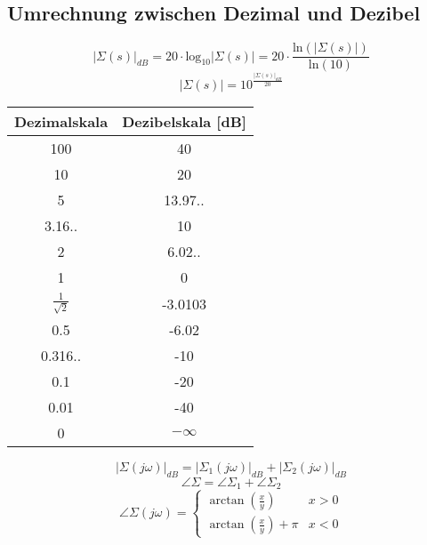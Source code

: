 \subsection{Umrechnung zwischen Dezimal und Dezibel}
    \begin{equation*}
        |\Sigma(s)|_{dB} = 20 \cdot \textrm{log}_{10}|\Sigma(s)| =             20\cdot\frac{\textrm{ln}(|\Sigma(s)|)}{\textrm{ln}(10)}
    \end{equation*}
    \begin{equation*}
        |\Sigma(s)| = 10^{\frac{|\Sigma(s)|_{dB}}{20}}
    \end{equation*}
    \begin{center}
    {\renewcommand{\arraystretch}{1.4}
        \begin{tabular}{c|c}
        Dezimalskala    &   Dezibelskala [dB]\\
        \hline
        100 &   40  \\
        10  &   20  \\
        5   &   13.97..\\
        3.16.. & 10\\
        2   &   6.02..\\
        1   &   0   \\
        $\frac{1}{\sqrt{2}}$  &   -3.0103\\
        0.5 & -6.02\\
        0.316.. & -10\\
        0.1 &   -20 \\
        0.01    &   -40\\
        0       &   $-\infty$
        \end{tabular}}
    \end{center}
    \begin{equation*}
        |\Sigma(j\omega)|_{dB} = |\Sigma_1(j\omega)|_{dB}+|\Sigma_2(j\omega)|_{dB}
    \end{equation*}
    \begin{equation*}
        \angle\Sigma= \angle\Sigma_{1}+ \angle\Sigma_{2}
    \end{equation*}
    \begin{equation*}
        \angle\Sigma(j\omega)=
        \begin{cases}
            \arctan(\frac{x}{y}) & x > 0\\
            \arctan(\frac{x}{y})+\pi & x<0
        \end{cases}
    \end{equation*}
    
